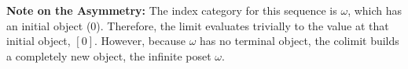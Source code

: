 \medskip
\noindent\textbf{Note on the Asymmetry:}
The index category for this sequence is $\omega$, which has an initial object
($0$). Therefore, the limit evaluates trivially to the value at that initial
object, $[0]$. However, because $\omega$ has no terminal object, the colimit
builds a completely new object, the infinite poset $\omega$.
